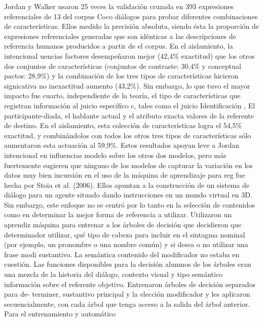 Jordan y Walker usaron 25 veces la validaci\'on cruzada en 393 expresiones referenciales
de 13 del corpus Coco di\'alogos para probar diferentes combinaciones de caracter\'isticas. Ellos
medido la precisi\'on absoluta, siendo \'esta la proporci\'on de expresiones referenciales
generadas que son id\'enticas a las descripciones de referencia humanos producidos a partir de
el corpus. En el aislamiento, la intencional uencias factores desempe\~naron mejor (42,4\%
exactitud) que los otros dos conjuntos de caracter\'isticas (conjuntos de contraste: 30,4\% y conceptual
pactos: 28,9\%) y la combinaci\'on de los tres tipos de caracter\'isticas hicieron signicativa no inexactitud aumento (43,2\%). Sin embargo, lo que tuvo el mayor impacto fue cuarto,
independiente de la teor\'ia, el tipo de caracter\'isticas que registran informaci\'on al juicio espec\'ifico c, tales
como el juicio
Identificaci\'on
, El participante-diada, el hablante actual y el atributo exacta
valores de la referente de destino. En el aislamiento, esta colecci\'on de caracter\'isticas logra el 54,5\%
exactitud, y combin\'andolos con todos los otros tres tipos de caracter\'isticas s\'olo aumentaron
esta actuaci\'on al 59,9\%. Estos resultados apoyan leve a Jordan intencional
en
influencias modelo sobre los otros dos modelos, pero m\'as fuertemente sugieren que ninguno
de los modelos de capturar la variaci\'on en los datos muy bien
incursi\'on en el uso de la m\'aquina de aprendizaje para
reg
fue hecha por Stoia et al.
(2006). Ellos apuntan a la construcci\'on de un sistema de di\'alogo para un agente situado dando
instrucciones en un mundo virtual en 3D. Sin embargo, este enfoque no se centr\'o por lo
tanto en la selecci\'on de contenidos como en determinar la mejor forma de referencia a utilizar.
Utilizaron un aprendiz m\'aquina para entrenar a los \'arboles de decisi\'on que decidieron que determinador
utilizar, qu\'e tipo de cabeza para incluir en el sintagma nominal (por ejemplo, un pronombre o una
nombre com\'un) y si desea o no utilizar una frase modi sustantivo. La sem\'antica
contenido del modificador no estaba en cuesti\'on. Las funciones disponibles para la decisi\'on
alumnos de los \'arboles eran una mezcla de la historia del di\'alogo, contexto visual y tipo sem\'antico
informaci\'on sobre el referente objetivo. Entrenaron \'arboles de decisi\'on separados para de-
terminer, sustantivo principal y la elecci\'on modificador y les aplicaron secuencialmente, con cada \'arbol que tenga acceso a la salida del \'arbol anterior. Para el entrenamiento y autom\'atico
